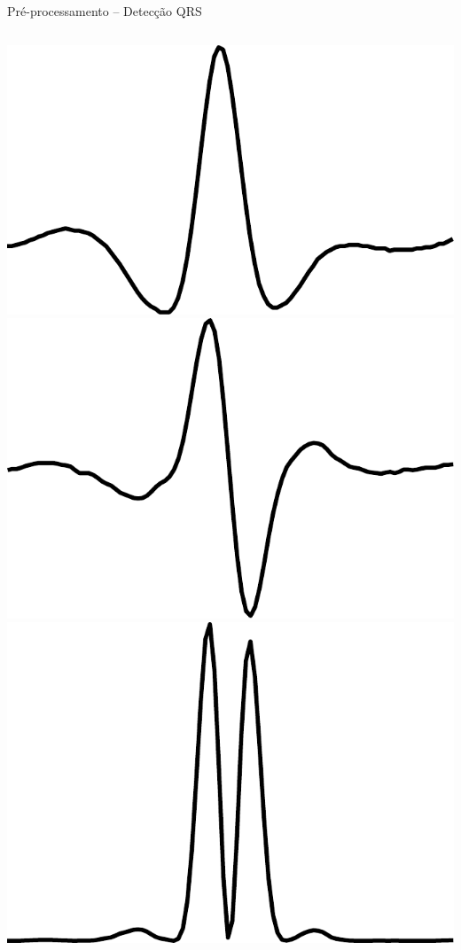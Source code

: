 \begin{frame}{Pré-processamento -- Detecção QRS}
\begin{columns}[b]
        \includegraphics[scale=0.15]{figures/highpass.pdf}
        \includegraphics[scale=0.15]{figures/differentiator.pdf}
        \includegraphics[scale=0.15]{figures/squaring.pdf}

\end{columns}
\end{frame}
